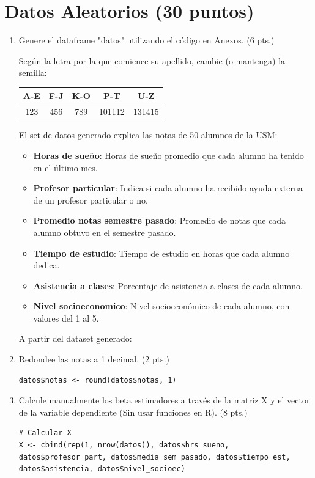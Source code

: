 \documentclass[letterpaper,11pt]{article}
\begin{document}
\section{Datos Aleatorios (30 puntos)}
\begin{enumerate}
    \item Genere el dataframe "datos" utilizando el código en Anexos. (6 pts.)

Según la letra por la que comience su apellido, cambie (o mantenga) la semilla:

\begin{table}[htbp]
\centering
\begin{tabular}{|c|c|c|c|c|}
\hline
\textbf{A-E} & \textbf{F-J} & \textbf{K-O} & \textbf{P-T} & \textbf{U-Z} \\
\hline
123 & 456 & 789 & 101112 & 131415 \\
\hline
\end{tabular}
\label{tabla:division-alfabeto}
\end{table}

El set de datos generado explica las notas de 50 alumnos de la USM:

\begin{itemize}
    \item \textbf{Horas de sueño}: Horas de sueño promedio que cada alumno ha tenido en el último mes.
    \item \textbf{Profesor particular}: Indica si cada alumno ha recibido ayuda externa de un profesor particular o no.
    \item \textbf{Promedio notas semestre pasado}: Promedio de notas que cada alumno obtuvo en el semestre pasado.
    \item \textbf{Tiempo de estudio}: Tiempo de estudio en horas que cada alumno dedica.
    \item \textbf{Asistencia a clases}: Porcentaje de asistencia a clases de cada alumno.
    \item \textbf{Nivel socioeconomico}: Nivel socioeconómico de cada alumno, con valores del 1 al 5.
\end{itemize}

A partir del dataset generado:
    \item Redondee las notas a 1 decimal. (2 pts.)
\begin{lstlisting}
datos$notas <- round(datos$notas, 1)
\end{lstlisting}


    \item Calcule manualmente los beta estimadores a través de la matriz X y el vector de la variable dependiente (Sin usar funciones en R). (8 pts.)
\begin{lstlisting}
# Calcular X
X <- cbind(rep(1, nrow(datos)), datos$hrs_sueno, datos$profesor_part, datos$media_sem_pasado, datos$tiempo_est, datos$asistencia, datos$nivel_socioec)


\end{lstlisting}
\end{enumerate}
\end{document}
